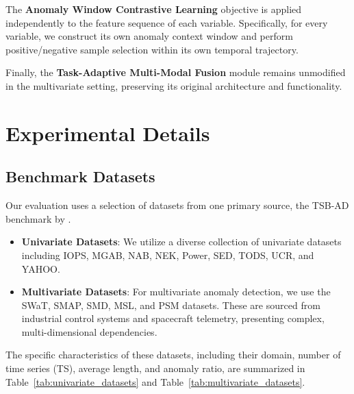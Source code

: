 \documentclass{article}
\theoremstyle{plain}
\theoremstyle{definition}
\theoremstyle{remark}
\begin{document}
The \textbf{Anomaly Window Contrastive Learning} objective is applied independently to the feature sequence of each variable. Specifically, for every variable, we construct its own anomaly context window and perform positive/negative sample selection within its own temporal trajectory.

Finally, the \textbf{Task-Adaptive Multi-Modal Fusion} module remains unmodified in the multivariate setting, preserving its original architecture and functionality.

\section{Experimental Details}\label{appendix:B}
\subsection{Benchmark Datasets}\label{appendix:data_details}

Our evaluation uses a selection of datasets from one primary source, the TSB-AD benchmark by \cite{liu2024elephant}.

\begin{itemize}
    \item \textbf{Univariate Datasets}: We utilize a diverse collection of univariate datasets including IOPS, MGAB, NAB, NEK, Power, SED, TODS, UCR, and YAHOO.
    \item \textbf{Multivariate Datasets}: For multivariate anomaly detection, we use the SWaT, SMAP, SMD, MSL, and PSM datasets. These are sourced from industrial control systems and spacecraft telemetry, presenting complex, multi-dimensional dependencies.
\end{itemize}

The specific characteristics of these datasets, including their domain, number of time series (TS), average length, and anomaly ratio, are summarized in Table~\ref{tab:univariate_datasets} and Table~\ref{tab:multivariate_datasets}.
\end{document}
